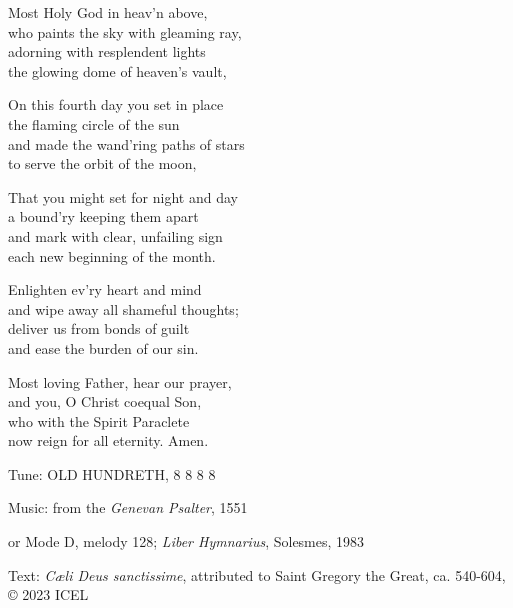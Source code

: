 \hymn

\begin{hymnverse}
Most Holy God in heav’n above,\\
who paints the sky with gleaming ray,\\
adorning with resplendent lights\\
the glowing dome of heaven’s vault,

On this fourth day you set in place\\
the flaming circle of the sun\\
and made the wand’ring paths of stars\\
to serve the orbit of the moon,

That you might set for night and day\\
a bound’ry keeping them apart\\
and mark with clear, unfailing sign\\
each new beginning of the month.

Enlighten ev’ry heart and mind\\
and wipe away all shameful thoughts;\\
deliver us from bonds of guilt\\
and ease the burden of our sin.

Most loving Father, hear our prayer,\\
and you, O Christ coequal Son,\\
who with the Spirit Paraclete\\
now reign for all eternity. Amen.
\end{hymnverse}

\begin{hymnsource}
Tune: OLD HUNDRETH, 8 8 8 8

Music: from the \emph{Genevan Psalter}, 1551

or Mode D, melody 128; \emph{Liber Hymnarius}, Solesmes, 1983

Text: \emph{Cæli Deus sanctissime}, attributed to Saint Gregory the Great, ca. 540-604, © 2023 ICEL
\end{hymnsource}